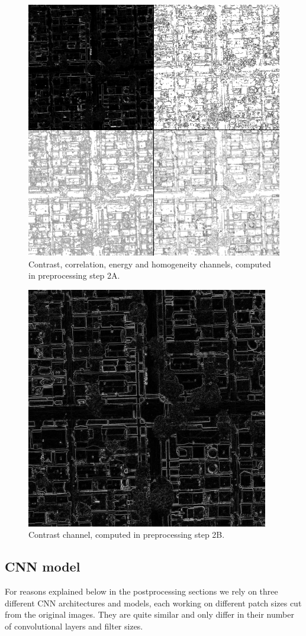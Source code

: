 \documentclass[10pt,conference,compsocconf]{IEEEtran}
\begin{document}
\begin{figure}
	\includegraphics[width=\columnwidth]{pictures/preproc1_all}
	\caption{Contrast, correlation, energy and homogeneity channels, computed in preprocessing step 2A.}
	\label{fig:preproc_glcm}
\end{figure}
\begin{figure}
	\centering
	\includegraphics[width=.5\columnwidth]{pictures/preproc2}
	\caption{Contrast channel, computed in preprocessing step 2B.}
	\label{fig:preproc_simple}
\end{figure}

\subsection{CNN model}
For reasons explained below in the postprocessing sections we rely on three different CNN architectures and models, each working on different patch sizes cut from the original images. They are quite similar and only differ in their number of convolutional layers and filter sizes. 
\end{document}
